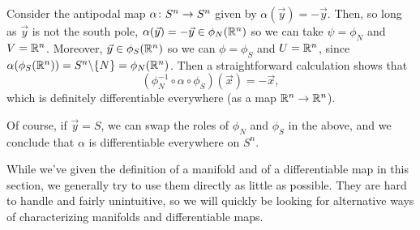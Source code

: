 
\begin{example}
	Consider the antipodal map $\alpha \colon\thinspace\! S^n \to S^n$ given by $\alpha(\vec{y}) = -\vec{y}$. Then, so long as $\vec{y}$ is not the south pole, $\alpha(\vec{y}) = -\vec{y} \in \phi_N(\mathbb{R}^n)$ so we can take $\psi = \phi_N$ and $V = \mathbb{R}^n$. Moreover, $\vec{y} \in \phi_S(\mathbb{R}^n)$ so we can $\phi = \phi_S$ and $U = \mathbb{R}^n$, since $\alpha(\phi_S(\mathbb{R}^n)) = S^n \backslash\{N\} = \phi_N(\mathbb{R}^n)$. Then a straightforward calculation shows that
	\[
		(\phi_N^{-1} \circ \alpha \circ \phi_S)(\vec{x}) = -\vec{x},
	\]
	which is definitely differentiable everywhere (as a map $\mathbb{R}^n \to \mathbb{R}^n$). 
	
	Of course, if $\vec{y} = S$, we can swap the roles of $\phi_N$ and $\phi_S$ in the above, and we conclude that $\alpha$ is differentiable everywhere on $S^n$.
\end{example}

While we've given the definition of a manifold and of a differentiable map in this section, we generally try to use them directly as little as possible. They are hard to handle and fairly unintuitive, so we will quickly be looking for alternative ways of characterizing manifolds and differentiable maps.
